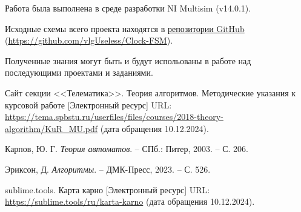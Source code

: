 \documentclass[a4paper, final]{article}
\begin{document}
Работа была выполнена в среде разработки NI Multisim (v14.0.1).

Исходные схемы всего проекта находятся в \href{https://github.com/vlgUseless/Clock-FSM}
{репозитории GitHub} (\url{https://github.com/vlgUseless/Clock-FSM}).

Полученные знания могут быть и будут испольованы в работе над последующими проектами и заданиями.

\cleardoublepage
{}
\newpage
\begin{thebibliography}{0}
	Сайт секции <<Телематика>>. Теория алгоритмов. Методические указания к курсовой работе [Электронный ресурс] URL: \url{https://tema.spbstu.ru/userfiles/files/courses/2018-theory-algorithm/KuR_MU.pdf} (дата обращения 10.12.2024).

  Карпов, Ю. Г. \textit{Теория автоматов}. -- СПб.: Питер, 2003. -- С. 206.

  Эриксон, Д. \textit{Алгоритмы}. -- ДМК-Пресс, 2023. -- С. 526.

	sublime.tools. Карта карно [Электронный ресурс] URL: \url{https://sublime.tools/ru/karta-karno} (дата обращения 10.12.2024).
\end{thebibliography}
\end{document}
